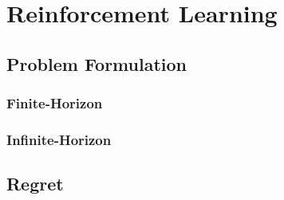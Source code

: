 \chapter{Reinforcement Learning}
\label{ch:rl_finite_horizon}

\section{Problem Formulation}

\subsection{Finite-Horizon}


\subsection{Infinite-Horizon}


\section{Regret}
\label{sec:regret}

